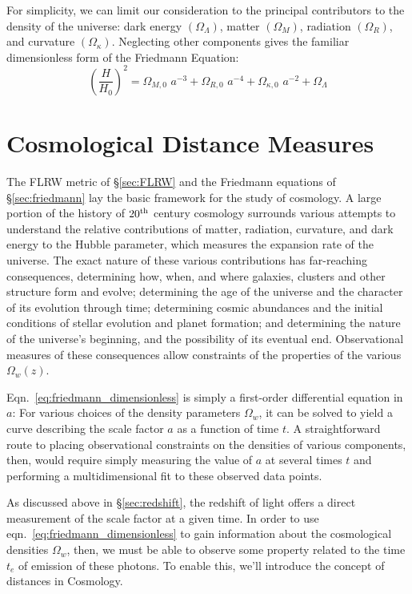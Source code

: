For simplicity, we can limit our consideration to the principal contributors
to the density of the universe:
dark energy $(\Omega_\Lambda)$, matter $(\Omega_M)$, radiation $(\Omega_R)$,
and curvature $(\Omega_\kappa)$.  Neglecting other components gives the
familiar dimensionless form of the Friedmann Equation:
\begin{equation}
  \label{eq:friedmann_dimensionless}
  \left(\frac{H}{H_0}\right)^2
  = \Omega_{M,0}\,\,a^{-3} + \Omega_{R,0}\,\,a^{-4}
  + \Omega_{\kappa,0}\,\,a^{-2} + \Omega_\Lambda
\end{equation}

\section{Cosmological Distance Measures}
\label{sec:distances}
The FLRW metric of \S\ref{sec:FLRW} and the Friedmann equations of
\S\ref{sec:friedmann} lay the basic framework for the study of cosmology.
A large portion of
the history of $20^{\rm th}$ century cosmology surrounds various
attempts to understand the relative contributions of matter, radiation,
curvature, and dark energy to the Hubble parameter, which measures
the expansion rate of the universe.  The exact nature of these various
contributions has far-reaching consequences,
determining how, when, and where galaxies, clusters and other structure
form and evolve; determining the age of the universe and the character of
its evolution through time; determining cosmic abundances and 
the initial conditions of stellar evolution
and planet formation; and determining the nature of the universe's beginning,
and the possibility of its eventual end.
Observational measures of these consequences allow constraints of the
properties of the various $\Omega_w(z)$.

Eqn.~\ref{eq:friedmann_dimensionless} is simply a first-order differential
equation in $a$: For various choices of the density parameters $\Omega_w$, it
can be solved to yield a curve describing the scale factor $a$ as a function
of time $t$.  A straightforward route to placing
observational constraints on the densities of
various components, then, would require simply measuring the value of $a$ at
several times $t$ and performing a multidimensional fit to these observed
data points.

As discussed above in \S\ref{sec:redshift}, the redshift of
light offers a direct measurement of the scale factor at a given time.
In order to use eqn.~\ref{eq:friedmann_dimensionless} to gain information
about the cosmological densities $\Omega_w$, then, we must be able to
observe some property related to the time $t_e$ of emission of these photons.
To enable this, we'll introduce the concept of distances in Cosmology.

